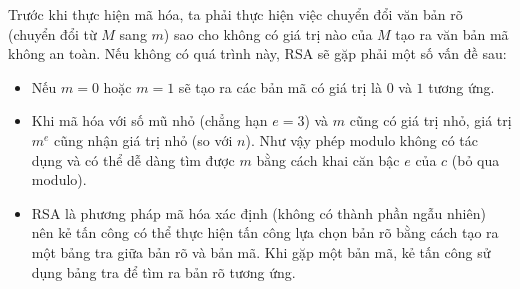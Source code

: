 Trước khi thực hiện mã hóa, ta phải thực hiện việc chuyển đổi văn bản rõ (chuyển đổi từ $M$ sang $m$) sao cho không có giá trị nào của $M$ tạo ra văn bản mã không an toàn. Nếu không có quá trình này, RSA sẽ gặp phải một số vấn đề sau:
\begin{itemize}
    \item Nếu $m=0$ hoặc $m=1$ sẽ tạo ra các bản mã có giá trị là $0$ và $1$ tương ứng.
    \item Khi mã hóa với số mũ nhỏ (chẳng hạn $e=3$) và $m$ cũng có giá trị nhỏ, giá trị $m^e$ cũng nhận giá trị nhỏ (so với $n$). Như vậy phép modulo không có tác dụng và có thể dễ dàng tìm được $m$ bằng cách khai căn bậc $e$ của $c$ (bỏ qua modulo).
    \item RSA là phương pháp mã hóa xác định (không có thành phần ngẫu nhiên) nên kẻ tấn công có thể thực hiện tấn công lựa chọn bản rõ bằng cách tạo ra một bảng tra giữa bản rõ và bản mã. Khi gặp một bản mã, kẻ tấn công sử dụng bảng tra để tìm ra bản rõ tương ứng.
\end{itemize}